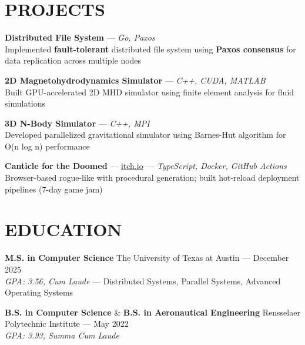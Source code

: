 \documentclass{article}
\begin{document}
\section*{PROJECTS}
\textbf{Distributed File System} — \textit{Go, Paxos} \\
Implemented \textbf{fault-tolerant} distributed file system using \textbf{Paxos consensus} for data replication across multiple nodes

\textbf{2D Magnetohydrodynamics Simulator} — \textit{C++, CUDA, MATLAB} \\
Built GPU-accelerated 2D MHD simulator using finite element analysis for fluid simulations

\textbf{3D N-Body Simulator} — \textit{C++, MPI} \\
Developed parallelized gravitational simulator using Barnes-Hut algorithm for O(n log n) performance

\textbf{Canticle for the Doomed} — \href{https://sve009.itch.io/canticle-for-the-doomed}{itch.io} — \textit{TypeScript, Docker, GitHub Actions} \\
Browser-based rogue-like with procedural generation; built hot-reload deployment pipelines (7-day game jam)

\section*{EDUCATION}
\textbf{M.S. in Computer Science} \hfill The University of Texas at Austin — December 2025 \\
\textit{GPA: 3.56, Cum Laude} — Distributed Systems, Parallel Systems, Advanced Operating Systems

\textbf{B.S. in Computer Science} \& \textbf{B.S. in Aeronautical Engineering} \hfill Rensselaer Polytechnic Institute — May 2022 \\
\textit{GPA: 3.93, Summa Cum Laude}
\end{document}
